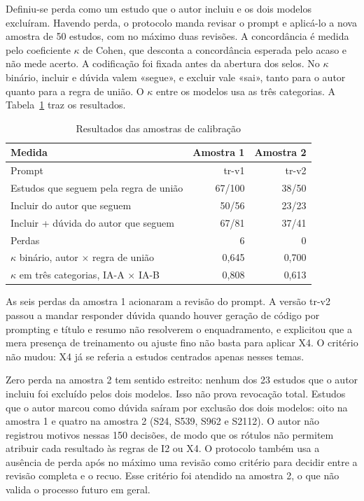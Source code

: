 Definiu-se perda como um estudo que o autor incluiu e os dois modelos excluíram. Havendo perda, o
protocolo manda revisar o prompt e aplicá-lo a nova amostra de 50 estudos, com no máximo duas revisões.
A concordância é medida pelo coeficiente $\kappa$ de Cohen, que desconta a concordância esperada pelo acaso e
não mede acerto. A codificação foi fixada antes da abertura dos selos. No $\kappa$ binário, incluir e dúvida valem
«segue», e excluir vale «sai», tanto para o autor quanto para a regra de união. O $\kappa$ entre os
modelos usa as três categorias. A Tabela~\ref{tab:piloto} traz os resultados.

\begin{table}[!htb]
\caption{Resultados das amostras de calibração}\label{tab:piloto}
\centering\footnotesize
\begin{tabular}{@{}lrr@{}}
\hline
Medida & Amostra 1 & Amostra 2\\
\hline
Prompt & tr-v1 & tr-v2\\
Estudos que seguem pela regra de união & 67/100 & 38/50\\
Incluir do autor que seguem & 50/56 & 23/23\\
Incluir + dúvida do autor que seguem & 67/81 & 37/41\\
Perdas & 6 & 0\\
$\kappa$ binário, autor $\times$ regra de união & 0,645 & 0,700\\
$\kappa$ em três categorias, IA-A $\times$ IA-B & 0,808 & 0,613\\
\hline
\end{tabular}
\end{table}

As seis perdas da amostra 1 acionaram a revisão do prompt. A versão tr-v2 passou a mandar responder
dúvida quando houver geração de código por prompting e título e resumo não resolverem o enquadramento,
e explicitou que a mera presença de treinamento ou ajuste fino não basta para aplicar X4. O critério não
mudou: X4 já se referia a estudos centrados apenas nesses temas.

Zero perda na amostra 2 tem sentido estreito: nenhum dos 23 estudos que o autor incluiu foi excluído
pelos dois modelos. Isso não prova revocação total. Estudos que o autor marcou como dúvida saíram por
exclusão dos dois modelos: oito na amostra 1 e quatro na amostra 2 (S24, S539, S962 e S2112). O autor
não registrou motivos nessas 150 decisões, de modo que os rótulos não permitem atribuir cada resultado
às regras de I2 ou X4. O protocolo também usa a ausência de perda após no máximo uma revisão como
critério para decidir entre a revisão completa e o recuo. Esse critério foi atendido na amostra 2, o que
não valida o processo futuro em geral.

